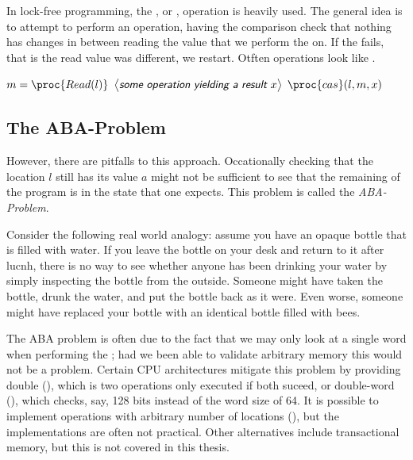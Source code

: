 In lock-free programming, the , or , operation is heavily used.
The general idea is to attempt to perform an operation, having the comparison check that nothing
has changes in between reading the value that we perform the  on. If the 
fails, that is the read value was different, we restart. Otften operations look like
.

\begin{codebox}
\li \While \Then
\li $m = \proc{Read(l)}$
\li $\lit{some operation yielding a result $x$}$
\li \If $\proc{cas}(l, m, x)$ \Then
\li \Return
\End \End
\end{codebox}

\subsection{The ABA-Problem\label{sec:aba-problem}}

However, there are pitfalls to this approach. Occationally checking that the location $l$ still has
its value $a$ might not be sufficient to see that the remaining of the program is in the state that
one expects. This problem is called the \emph{ABA-Problem}.

Consider the following real world analogy: assume you have an opaque bottle that is filled with
water. If you leave the bottle on your desk and return to it after lucnh, there is no way to see
whether anyone has been drinking your water by simply inspecting the bottle from the outside.
Someone might have taken the bottle, drunk the water, and put the bottle back as it were. Even
worse, someone might have replaced your bottle with an identical bottle filled with bees.

The ABA problem is often due to the fact that we may only look at a single word when performing the
; had we been able to validate arbitrary memory this would not be a problem. Certain CPU
architectures mitigate this problem by providing double  (), which
is two  operations only executed if both suceed, or double-word 
(), which checks, say, 128 bits instead of the word size of 64.  It is possible to
implement  operations with arbitrary number of locations
()\cite{harris2002practical,luchangco2003nonblocking}, but the implementations are often
not practical. Other alternatives include transactional memory, but this is not covered in this
thesis.


